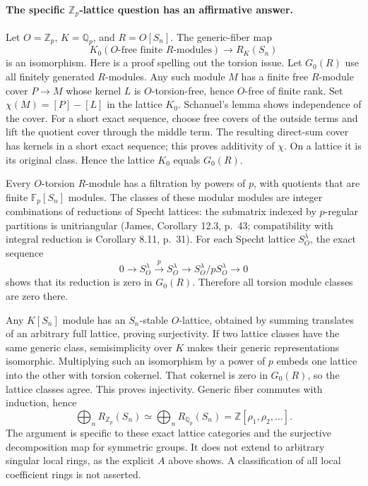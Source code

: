 \paragraph{The specific $\mathbb Z_p$-lattice question has an affirmative answer.}
Let $O=\mathbb Z_p$, $K=\mathbb Q_p$, and $R=O[S_n]$. The generic-fiber
map
\[
 K_0(\text{$O$-free finite $R$-modules})\longrightarrow R_K(S_n)
\]
is an isomorphism. Here is a proof spelling out the torsion issue.
Let $G_0(R)$ use all finitely generated $R$-modules. Any such module
$M$ has a finite free $R$-module cover $P\to M$ whose kernel $L$ is
$O$-torsion-free, hence $O$-free of finite rank. Set
$\chi(M)=[P]-[L]$ in the lattice $K_0$. Schanuel's lemma shows
independence of the cover. For a short exact sequence, choose free
covers of the outside terms and lift the quotient cover through the
middle term. The resulting direct-sum cover has kernels in a short
exact sequence; this proves additivity of $\chi$. On a lattice it
is its original class. Hence the lattice $K_0$ equals $G_0(R)$.

Every $O$-torsion $R$-module has a filtration by powers of $p$, with
quotients that are finite $\mathbb F_p[S_n]$ modules. The classes of
these modular modules are integer combinations of reductions of
Specht lattices: the submatrix indexed by $p$-regular partitions is
unitriangular (James, Corollary 12.3, p.~43; compatibility with
integral reduction is Corollary 8.11, p.~31). For each Specht lattice
$S_O^\lambda$, the exact sequence
\[
 0\longrightarrow S_O^\lambda\xrightarrow{p}S_O^\lambda
 \longrightarrow S_O^\lambda/pS_O^\lambda\longrightarrow0
\]
shows that its reduction is zero in $G_0(R)$. Therefore all torsion
module classes are zero there.

Any $K[S_n]$ module has an $S_n$-stable $O$-lattice, obtained by
summing translates of an arbitrary full lattice, proving surjectivity.
If two lattice classes have the same generic class, semisimplicity
over $K$ makes their generic representations isomorphic. Multiplying
such an isomorphism by a power of $p$ embeds one lattice into the
other with torsion cokernel. That cokernel is zero in $G_0(R)$, so
the lattice classes agree. This proves injectivity. Generic fiber
commutes with induction, hence
\[
 \bigoplus_n R_{\mathbb Z_p}(S_n)\simeq
 \bigoplus_n R_{\mathbb Q_p}(S_n)=\mathbb Z[\rho_1,\rho_2,\ldots].
\]
The argument is specific to these exact lattice categories and the
surjective decomposition map for symmetric groups. It does not extend
to arbitrary singular local rings, as the explicit $A$ above shows.
A classification of all local coefficient rings is not asserted.


